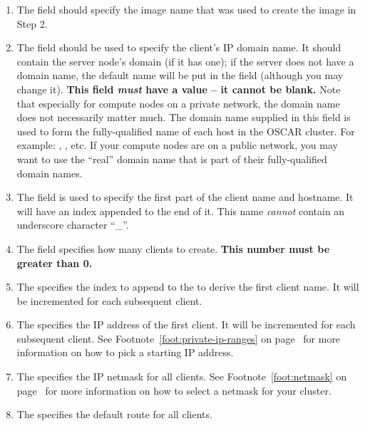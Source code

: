 \begin{enumerate}
  
\item The  field should specify the image name that
  was used to create the image in Step 2.
  
\item The  field should be used to specify the
  client's IP domain name.  
%
  It should contain the server node's domain (if it has one); if the
  server does not have a domain name, the default name
   will be put in the field (although you may
  change it).
%
  {\bf This field \emph{must} have a value -- it cannot be blank.}
%
  Note that especially for compute nodes on a private network, the
  domain name does not necessarily matter much.  The domain name
  supplied in this field is used to form the fully-qualified name of
  each host in the OSCAR cluster.  For example:
  ,
  , etc.  If your compute nodes are
  on a public network, you may want to use the ``real'' domain name
  that is part of their fully-qualified domain names.

\item The  field is used to specify the first part of
  the client name and hostname. It will have an index appended to the
  end of it. This name \emph{cannot} contain an underscore 
  character ``\_''.

\item The  field specifies how many clients to
  create.  {\bf This number must be greater than 0.}
  
\item The  specifies the index to append to the
   to derive the first client name. It will be
  incremented for each subsequent client.

\item The  specifies the IP address of the first
  client. It will be incremented for each subsequent client.  See
  Footnote~\ref{foot:private-ip-ranges} on
  page~\pageref{foot:private-ip-ranges} for more information on how to
  pick a starting IP address.
  
\item The  specifies the IP netmask for all
  clients.  See Footnote~\ref{foot:netmask} on
  page~\pageref{foot:netmask} for more information on how to select a
  netmask for your cluster.
  
\item The  specifies the default route for all
  clients.

\end{enumerate}
  
